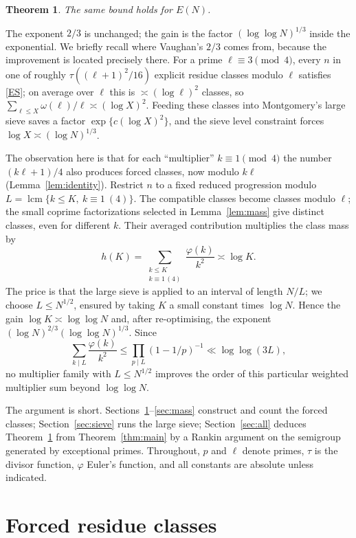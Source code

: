 \documentclass[11pt,reqno]{amsart}
\newtheorem{theorem}{Theorem}[section]
\newcommand{\lcm}{\operatorname{lcm}}
\begin{document}
\begin{theorem}\label{thm:all}
The same bound holds for $E(N)$.
\end{theorem}

The exponent $2/3$ is unchanged; the gain is the factor $(\log\log N)^{1/3}$
inside the exponential.  We briefly recall where Vaughan's $2/3$ comes from,
because the improvement is located precisely there.  For a prime
$\ell\equiv3\pmod4$, every $n$ in one of roughly $\tau((\ell+1)^2/16)$
explicit residue classes modulo $\ell$ satisfies \eqref{ES}; on average over
$\ell$ this is $\asymp(\log\ell)^2$ classes, so
$\sum_{\ell\le X}\omega(\ell)/\ell\asymp(\log X)^2$.  Feeding these classes
into Montgomery's large sieve saves a factor $\exp\{c(\log X)^2\}$, and the
sieve level constraint forces $\log X\asymp(\log N)^{1/3}$.

The observation here is that for each ``multiplier'' $k\equiv1\pmod4$ the
number $(k\ell+1)/4$ also produces forced classes, now modulo $k\ell$
(Lemma~\ref{lem:identity}).  Restrict $n$ to a fixed reduced progression
modulo $L=\lcm\{k\le K,\ k\equiv1\ (4)\}$.  The compatible classes become
classes modulo $\ell$; the small coprime factorizations selected in
Lemma~\ref{lem:mass} give distinct classes, even for different $k$.
Their averaged contribution multiplies the
class mass by
\[
 h(K)=\sum_{\substack{k\le K\\ k\equiv1\,(4)}}\frac{\varphi(k)}{k^2}\asymp\log K .
\]
The price is that the large sieve is applied to an interval of length
$N/L$; we choose $L\le N^{1/2}$, ensured by taking $K$ a small constant
times $\log N$.  Hence the gain
$\log K\asymp\log\log N$ and, after re-optimising, the exponent
$(\log N)^{2/3}(\log\log N)^{1/3}$.  Since
\[
 \sum_{k\mid L}\frac{\varphi(k)}{k^2}\le\prod_{p\mid L}(1-1/p)^{-1}\ll\log\log(3L),
\]
no multiplier family with $L\le N^{1/2}$ improves the order of this
particular weighted multiplier sum beyond $\log\log N$.

The argument is short.  Sections~\ref{sec:identity}--\ref{sec:mass} construct
and count the forced classes; Section~\ref{sec:sieve} runs the large sieve;
Section~\ref{sec:all} deduces Theorem~\ref{thm:all} from
Theorem~\ref{thm:main} by a Rankin argument on the semigroup generated by
exceptional primes.  Throughout, $p$ and $\ell$ denote primes, $\tau$ is the
divisor function, $\varphi$ Euler's function, and all constants are
absolute unless indicated.

\section{Forced residue classes}\label{sec:identity}
\end{document}
